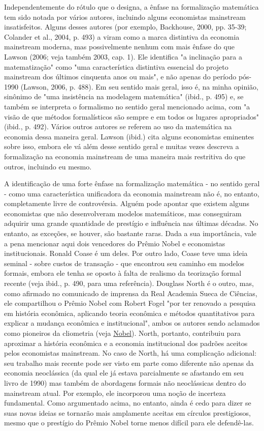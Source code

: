 \documentclass[a4paper,12pt]{article}[abntex2]
\begin{document}
Independentemente do rótulo que o designa, a ênfase na formalização matemática tem sido notada por vários autores, incluindo alguns economistas mainstream insatisfeitos. Alguns desses autores (por exemplo, Backhouse, 2000, pp. 35-39; Colander et al., 2004, p. 493) a viram como a marca distintiva da economia mainstream moderna, mas possivelmente nenhum com mais ênfase do que Lawson (2006; veja também 2003, cap. 1). Ele identifica "a inclinação para a matematização" como "uma característica distintiva essencial do projeto mainstream dos últimos cinquenta anos ou mais", e não apenas do período pós-1990 (Lawson, 2006, p. 488). Em seu sentido mais geral, isso é, na minha opinião, sinônimo de "uma insistência na modelagem matemática" (ibid., p. 495) e, se também se interpreta o formalismo no sentido geral mencionado acima, com "a visão de que métodos formalísticos são sempre e em todos os lugares apropriados" (ibid., p. 492). Vários outros autores se referem ao uso da matemática na economia dessa maneira geral. Lawson (ibid.) cita alguns economistas eminentes sobre isso, embora ele vá além desse sentido geral e muitas vezes descreva a formalização na economia mainstream de uma maneira mais restritiva do que outros, incluindo eu mesmo.

A identificação de uma forte ênfase na formalização matemática - no sentido geral - como uma característica unificadora da economia mainstream não é, no entanto, completamente livre de controvérsia. Alguém pode apontar que existem alguns economistas que não desenvolveram modelos matemáticos, mas conseguiram adquirir uma grande quantidade de prestígio e influência nas últimas décadas. No entanto, as exceções, se houver, são bastante raras. Dada a sua importância, vale a pena mencionar aqui dois vencedores do Prêmio Nobel e economistas institucionais. Ronald Coase é um deles. Por outro lado, Coase teve uma ideia seminal - sobre custos de transação - que encontrou seu caminho em modelos formais, embora ele tenha se oposto à falta de realismo da teorização formal recente (veja ibid., p. 490, para uma referência). Douglass North é o outro, mas, como afirmado no comunicado de imprensa da Real Academia Sueca de Ciências, ele compartilhou o Prêmio Nobel com Robert Fogel "por ter renovado a pesquisa em história econômica, aplicando teoria econômica e métodos quantitativos para explicar a mudança econômica e institucional", ambos os autores sendo aclamados como pioneiros da cliometria (veja \href{http://nobelprize.org/nobel_prizes/economics/laureates/1993/press.html}{Nobel}). North, portanto, contribuiu para aproximar a história econômica e a economia institucional dos padrões aceitos pelos economistas mainstream. No caso de North, há uma complicação adicional: seu trabalho mais recente pode ser visto em parte como diferente não apenas da economia neoclássica (da qual ele já estava parcialmente se afastando em seu livro de 1990) mas também de abordagens formais não neoclássicas dentro do mainstream atual. Por exemplo, ele incorporou uma noção de incerteza fundamental. Como argumentado acima, no entanto, ainda é cedo para dizer se suas novas ideias se tornarão mais amplamente aceitas em círculos prestigiosos, mesmo que o prestígio do Prêmio Nobel torne menos difícil para ele defendê-las.
\end{document}
